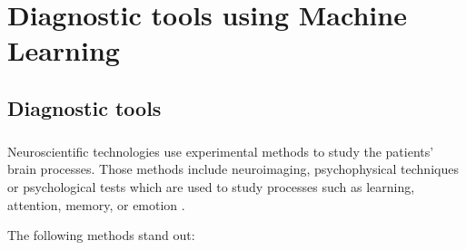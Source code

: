 \chapter{Diagnostic tools using Machine Learning} \label{chap:sota}
\label{chap:chap2}
\section*{}

\section{Diagnostic tools} \label{Diagnostic}

\paragraph{}Neuroscientific technologies use experimental methods to study the patients' brain processes. Those methods include neuroimaging, psychophysical techniques or psychological tests which are used to study processes such as learning, attention, memory, or emotion \cite{Corchs2019}.
\espaco

The following methods stand out:

